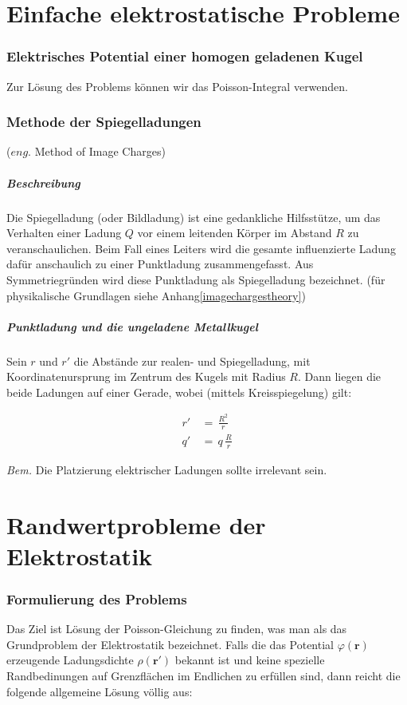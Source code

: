 \documentclass[titlepage,11pt,a4paper,ngerman]{report}
\renewcommand{\vec}[1]{\bm{#1}}
\renewcommand{\paragraph}[1]{\subsubsection{#1}}
\begin{document}
\newpage
\section{Einfache elektrostatische Probleme}
\paragraph{Elektrisches Potential einer homogen geladenen Kugel}
Zur Lösung des Problems können wir das Poisson-Integral verwenden. \cite{homkugelpot}

\paragraph{Methode der Spiegelladungen}
($eng.$ Method of Image Charges)

\subparagraph{Beschreibung}
Die Spiegelladung (oder Bildladung) ist eine gedankliche Hilfsstütze, um das Verhalten einer Ladung $Q$ vor einem leitenden Körper im Abstand $R$ zu veranschaulichen. Beim Fall eines Leiters wird die gesamte influenzierte Ladung dafür anschaulich zu einer Punktladung zusammengefasst. Aus Symmetriegründen wird diese Punktladung als Spiegelladung bezeichnet. (für physikalische Grundlagen siehe Anhang\ref{imagechargestheory})

\subparagraph{Punktladung und die ungeladene Metallkugel}
Sein $r$ und $r'$ die Abstände zur realen- und Spiegelladung, mit Koordinatenursprung im Zentrum des Kugels mit Radius $R$. Dann liegen die beide Ladungen auf einer Gerade, wobei (mittels Kreisspiegelung) gilt:

\begin{align*}
r'\,&=\,\frac{R^2}{r}\\
q'\,&=\,q\,\frac{R}{r}
\end{align*}

\emph{Bem.} Die Platzierung elektrischer Ladungen sollte irrelevant sein.

\section{Randwertprobleme der Elektrostatik}
\paragraph{Formulierung des Problems}
Das Ziel ist Lösung der Poisson-Gleichung zu finden, was man als das Grundproblem der Elektrostatik bezeichnet. Falls die das Potential $\varphi(\vec{r})$ erzeugende Ladungsdichte $\rho(\vec{r}')$ bekannt ist und keine spezielle Randbedinungen auf Grenzflächen im Endlichen zu erfüllen sind, dann reicht die folgende allgemeine Lösung völlig aus:
\end{document}
